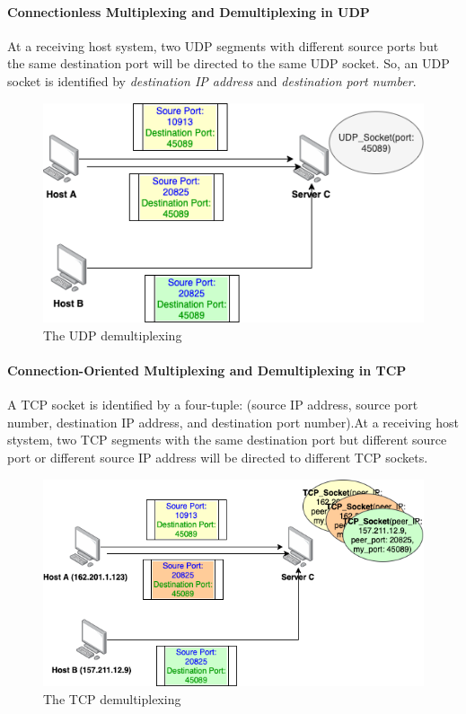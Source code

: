 \documentclass[a4paper, 11pt]{article}
\begin{document}
\paragraph{Connectionless Multiplexing and Demultiplexing in UDP}
At a receiving host system, two UDP segments with different source ports but the same destination port will be directed to the same UDP socket. So, an UDP socket is identified by \textit{destination IP address}  and \textit{destination port number}.

\begin{figure}[h]
\includegraphics[scale=0.6]{UDP-demultiplexing.png}
\caption{The UDP demultiplexing}
\end{figure}

\paragraph{Connection-Oriented Multiplexing and Demultiplexing in TCP}
A TCP socket is identified by a four-tuple: (source IP address, source port number, destination IP address, and destination port number).At a receiving host stystem, two TCP segments with the same destination port but different source port or different source IP address will be directed to different TCP sockets.

\begin{figure}[h]
\includegraphics[scale=0.6]{TCP-demultiplexing.png}
\caption{The TCP demultiplexing}
\end{figure}
\end{document}
